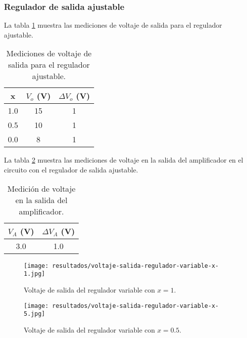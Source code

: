 \FloatBarrier
\subsubsection{Regulador de salida ajustable}

La tabla \ref{tab:mediciones-regulador-ajustable} muestra las mediciones de voltaje de salida para el regulador ajustable.

\begin{table}[ht]
    \centering
    \begin{tabular}{|c|c|c|}
        \hline
        x & $V_o$ (V) & $\Delta V_o$ (V) \\
        \hline
        1.0 & 15 & 1 \\
        0.5 & 10 & 1 \\
        0.0 & 8 & 1 \\
        \hline
    \end{tabular}
    \caption{Mediciones de voltaje de salida para el regulador ajustable.}
    \label{tab:mediciones-regulador-ajustable}
\end{table}

La tabla \ref{tab:mediciones-amplificador-regulador-ajustable} muestra las mediciones de voltaje en la salida del amplificador en el circuito con el regulador de salida ajustable.

\begin{table}[ht]
    \centering
    \begin{tabular}{|c|c|}
        \hline
        $V_A$ (V) & $\Delta V_A$ (V) \\
        \hline
        3.0 & 1.0 \\
        \hline
    \end{tabular}
    \caption{Medición de voltaje en la salida del amplificador.}
    \label{tab:mediciones-amplificador-regulador-ajustable}
\end{table}

\begin{figure}[ht]
    \centering
    \texttt{[image: resultados/voltaje-salida-regulador-variable-x-1.jpg]}
    \caption{Voltaje de salida del regulador variable con $x = 1$.}
    \label{fig:voltaje-salida-regulador-variable-x-1}
\end{figure}

\begin{figure}[ht]
    \centering
    \texttt{[image: resultados/voltaje-salida-regulador-variable-x-5.jpg]}
    \caption{Voltaje de salida del regulador variable con $x = 0.5$.}
    \label{fig:voltaje-salida-regulador-variable-x-5}
\end{figure}

